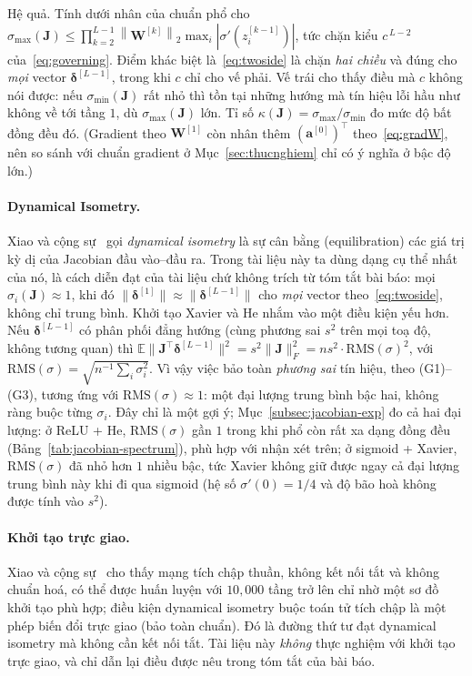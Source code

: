 {\medskip
\noindent Hệ quả. Tính dưới nhân của chuẩn phổ cho
$\sigma_{\max}(\mathbf{J})\le\prod_{k=2}^{L-1}\left\|\mathbf{W}^{[k]}\right\|_2
\max_i\left|\sigma'(z^{[k-1]}_i)\right|$, tức chặn kiểu $c^{\,L-2}$ của~\eqref{eq:governing}.
Điểm khác biệt là~\eqref{eq:twoside} là chặn \emph{hai chiều} và đúng cho \emph{mọi}
vector $\boldsymbol{\delta}^{[L-1]}$, trong khi $c$ chỉ cho vế phải. Vế trái cho thấy
điều mà $c$ không nói được: nếu $\sigma_{\min}(\mathbf{J})$ rất nhỏ thì tồn tại
những hướng mà tín hiệu lỗi hầu như không về tới tầng $1$, dù $\sigma_{\max}(\mathbf{J})$
lớn. Tỉ số $\kappa(\mathbf{J})=\sigma_{\max}/\sigma_{\min}$ đo mức độ bất đồng đều đó.
(Gradient theo $\mathbf{W}^{[1]}$ còn nhân thêm $(\mathbf{a}^{[0]})^{\top}$ theo~\eqref{eq:gradW},
nên so sánh với chuẩn gradient ở Mục~\ref{sec:thucnghiem} chỉ có ý nghĩa ở bậc độ lớn.)

\paragraph{Dynamical Isometry.} Xiao và cộng sự~\cite{Xiao2018DynIso} gọi
\emph{dynamical isometry} là sự cân bằng (equilibration) các giá trị kỳ dị của
Jacobian đầu vào--đầu ra. Trong tài liệu này ta dùng dạng cụ thể nhất của nó, là
cách diễn đạt của tài liệu chứ không trích từ tóm tắt bài báo: mọi
$\sigma_i(\mathbf{J})\approx1$, khi đó $\|\boldsymbol{\delta}^{[1]}\|\approx\|\boldsymbol{\delta}^{[L-1]}\|$ cho
\emph{mọi} vector theo~\eqref{eq:twoside}, không chỉ trung bình. Khởi tạo Xavier và He
nhắm vào một điều kiện yếu hơn. Nếu $\boldsymbol{\delta}^{[L-1]}$ có phân phối đẳng hướng
(cùng phương sai $s^2$ trên mọi toạ độ, không tương quan) thì
$\mathbb{E}\|\mathbf{J}^{\top}\boldsymbol{\delta}^{[L-1]}\|^{2}=s^{2}\|\mathbf{J}\|_F^{2}
=n s^{2}\cdot\mathrm{RMS}(\sigma)^{2}$, với $\mathrm{RMS}(\sigma)=\sqrt{n^{-1}\sum_i\sigma_i^{2}}$.
Vì vậy việc bảo toàn \emph{phương sai} tín hiệu, theo (G1)--(G3), tương ứng với
$\mathrm{RMS}(\sigma)\approx1$: một đại lượng trung bình bậc hai, không ràng buộc
từng $\sigma_i$. Đây chỉ là một gợi ý; Mục~\ref{subsec:jacobian-exp} đo cả hai đại lượng: ở ReLU + He, $\mathrm{RMS}(\sigma)$
gần $1$ trong khi phổ còn rất xa dạng đồng đều (Bảng~\ref{tab:jacobian-spectrum}),
phù hợp với nhận xét trên; ở sigmoid + Xavier, $\mathrm{RMS}(\sigma)$ đã nhỏ hơn $1$ nhiều
bậc, tức Xavier không giữ được ngay cả đại lượng trung bình này khi đi qua sigmoid
(hệ số $\sigma'(0)=1/4$ và độ bão hoà không được tính vào $s^{2}$).

\paragraph{Khởi tạo trực giao.} Xiao và cộng sự~\cite{Xiao2018DynIso} cho thấy mạng
tích chập thuần, không kết nối tắt và không chuẩn hoá, có thể được huấn luyện với
$10{,}000$ tầng trở lên chỉ nhờ một sơ đồ khởi tạo phù hợp; điều kiện dynamical
isometry buộc toán tử tích chập là một phép biến đổi trực giao (bảo toàn chuẩn). Đó là
đường thứ tư đạt dynamical isometry mà không cần kết nối tắt. Tài liệu này
\emph{không} thực nghiệm với khởi tạo trực giao, và chỉ dẫn lại điều được nêu trong
tóm tắt của bài báo.

}
